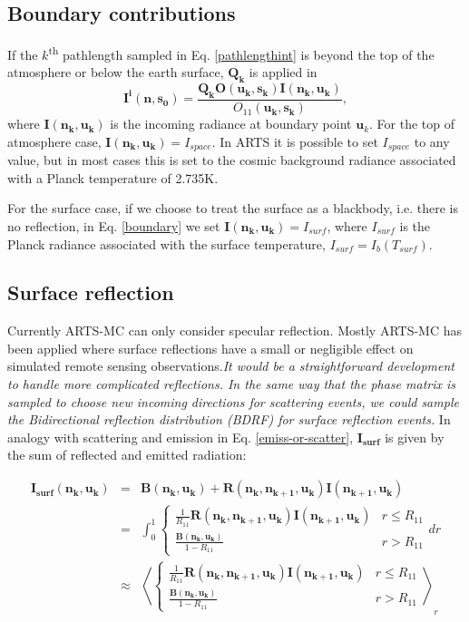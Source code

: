 \subsection {Boundary contributions}

If the $k$\textsuperscript{th} pathlength sampled in Eq. \ref{pathlengthint} is
beyond the top of the atmosphere or below the earth surface, $\mathbf{Q_k}$ is
applied in
\begin{equation}
\mathbf{I^i(n,s_0)}=\frac{\mathbf{Q_k}\mathbf{O(u_k,s_k)I(n_k,u_k)}}
{O_{11}(\mathbf{u_{k},s_k})},
\label{boundary}
\end{equation}
where $\mathbf{I(n_k,u_k)}$ is the incoming radiance at boundary point
$\mathbf{u}_{k}$.  For the top of atmosphere case,
$\mathbf{I(n_k,u_k)}=I_{space}$.  In ARTS it is possible to set $I_{space}$ to
any value, but in most cases this is set to the cosmic background radiance
associated with a Planck temperature of 2.735K.

For the surface case, if we choose to treat the surface as a blackbody, i.e.
there is no reflection, in Eq. \ref{boundary} we set
$\mathbf{I(n_k,u_k)}=I_{surf}$, where $I_{surf}$ is the Planck radiance
associated with the surface temperature, $I_{surf}=I_b\left(T_{surf}\right)$.

\subsection{Surface reflection} 
\label{sec:surf_refl}
Currently ARTS-MC can only consider specular reflection.  Mostly ARTS-MC has
been applied where surface reflections have a small or negligible effect on
simulated remote sensing observations.\emph{It would be a straightforward
development to handle more complicated reflections.  In the same way that the
phase matrix is sampled to choose new incoming directions for scattering events,
we could sample the Bidirectional reflection distribution (BDRF) for surface
reflection events.} In analogy with scattering and emission in Eq.
\ref{emiss-or-scatter}, $\mathbf{I_{surf}}$ is given by the sum of reflected and
emitted radiation:

\begin{eqnarray}
\mathbf{I_{surf}(n_k,u_k)}&=&\mathbf{B(n_k,u_k)}+
\mathbf{R(n_k,n_{k+1},u_k)I(n_{k+1},u_k)}\nonumber\\
&=&\int^1_0\left\{\begin{array}{rl}\frac{1}{R_{11}}
\mathbf{R(n_k,n_{k+1},u_k)I(n_{k+1},u_k)} & r \le R_{11}\\
\frac{\mathbf{B(n_k,u_k)}}{1-R_{11}}& r > R_{11}\end{array}dr\right.\nonumber\\
&\approx&
\left\langle\left\{\begin{array}{rl}\frac{1}{R_{11}}
\mathbf{R(n_k,n_{k+1},u_k)I(n_{k+1},u_k)} & r \le R_{11}\\
\frac{\mathbf{B(n_k,u_k)}}{1-R_{11}}& r > R_{11}\end{array}\right.\right\rangle_r
\label{I_surf}
\end{eqnarray}

